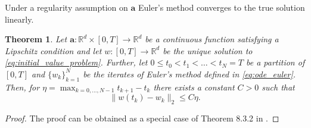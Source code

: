 \documentclass[12pt]{article}
\newtheorem{theorem}{Theorem}[section]
\theoremstyle{definition}
\numberwithin{equation}{section}
\newcommand{\R}{\mathbb{R}}
\newcommand{\norm}[1]{\lVert{#1}\rVert_2}
\begin{document}
Under a regularity assumption on $\mathbf{a}$ Euler's method converges to the true solution linearly.
\begin{theorem}
  \label{thm:euler_convergence}
  Let $\mathbf{a} : \R^d \times [0,T] \rightarrow \R^d$ be a continuous function satisfying a Lipschitz condition and let $w:[0,T] \rightarrow \R^d$ be the unique solution to \eqref{eq:initial_value_problem}. Further, let $0 \leq t_0 < t_1 < \dots < t_N = T$ be a partition of $[0,T]$ and $\{w_k\}_{k=1}^N$ be the iterates of Euler's method defined in \eqref{eq:ode_euler}. Then, for $\eta = \max_{k=0,\dots,N-1} t_{k+1} - t_k$ there exists a constant $C > 0$ such that
  \begin{equation*}
    \norm{w(t_k) - w_k} \leq C \eta.
  \end{equation*}
\end{theorem}
\begin{proof}
  The proof can be obtained as a special case of Theorem 8.3.2 in \cite[pp.~294]{kloedenNumericalSolutionStochastic2013}.
\end{proof}
\end{document}
